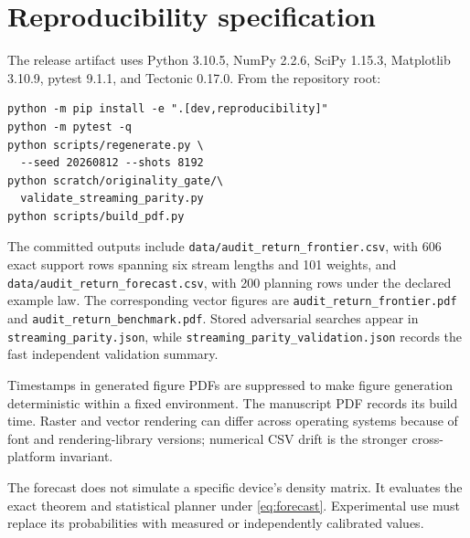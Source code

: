 \section{Reproducibility specification}
\label{app:reproducibility}

The release artifact uses Python 3.10.5, NumPy 2.2.6, SciPy 1.15.3, Matplotlib 3.10.9, pytest 9.1.1, and Tectonic 0.17.0. From the repository root:
\begin{small}
\begin{verbatim}
python -m pip install -e ".[dev,reproducibility]"
python -m pytest -q
python scripts/regenerate.py \
  --seed 20260812 --shots 8192
python scratch/originality_gate/\
  validate_streaming_parity.py
python scripts/build_pdf.py
\end{verbatim}
\end{small}

The committed outputs include \texttt{data/audit\_return\_frontier.csv}, with 606 exact support rows spanning six stream lengths and 101 weights, and \texttt{data/audit\_return\_forecast.csv}, with 200 planning rows under the declared example law. The corresponding vector figures are \texttt{audit\_return\_frontier.pdf} and \texttt{audit\_return\_benchmark.pdf}. Stored adversarial searches appear in \texttt{streaming\_parity.json}, while \texttt{streaming\_parity\_validation.json} records the fast independent validation summary.

Timestamps in generated figure PDFs are suppressed to make figure generation deterministic within a fixed environment. The manuscript PDF records its build time. Raster and vector rendering can differ across operating systems because of font and rendering-library versions; numerical CSV drift is the stronger cross-platform invariant.

The forecast does not simulate a specific device's density matrix. It evaluates the exact theorem and statistical planner under \eqref{eq:forecast}. Experimental use must replace its probabilities with measured or independently calibrated values.
